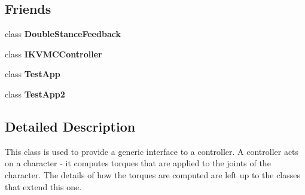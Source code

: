 \subsection*{Friends}
\begin{DoxyCompactItemize}
\item 
\hypertarget{classCartWheel_1_1Core_1_1Controller_a2e07ed1b8ea4d9b2cac0561eeab05a73}{
class {\bfseries DoubleStanceFeedback}}
\label{classCartWheel_1_1Core_1_1Controller_a2e07ed1b8ea4d9b2cac0561eeab05a73}

\item 
\hypertarget{classCartWheel_1_1Core_1_1Controller_af5a47720698d4e89c90de04a3571a0dd}{
class {\bfseries IKVMCController}}
\label{classCartWheel_1_1Core_1_1Controller_af5a47720698d4e89c90de04a3571a0dd}

\item 
\hypertarget{classCartWheel_1_1Core_1_1Controller_a53f540ec72017006b082b2cb716644c1}{
class {\bfseries TestApp}}
\label{classCartWheel_1_1Core_1_1Controller_a53f540ec72017006b082b2cb716644c1}

\item 
\hypertarget{classCartWheel_1_1Core_1_1Controller_afc60a5a7cb2c98d03f699118d5e75af1}{
class {\bfseries TestApp2}}
\label{classCartWheel_1_1Core_1_1Controller_afc60a5a7cb2c98d03f699118d5e75af1}

\end{DoxyCompactItemize}


\subsection{Detailed Description}
This class is used to provide a generic interface to a controller. A controller acts on a character -\/ it computes torques that are applied to the joints of the character. The details of how the torques are computed are left up to the classes that extend this one. 

